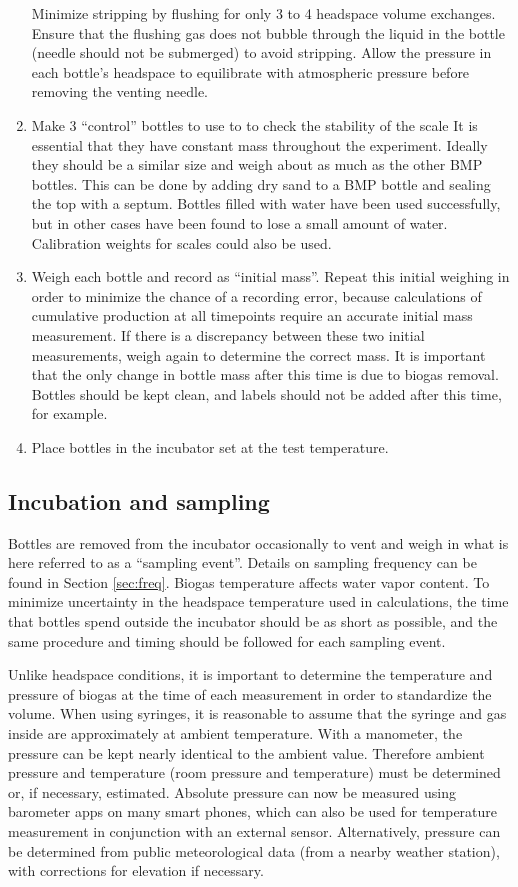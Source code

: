 \documentclass[]{article}
\begin{document}
\begin{enumerate}
{} 
      Minimize  stripping by flushing for only 3 to 4 headspace volume exchanges. 
      Ensure that the flushing gas does not bubble through the liquid in the bottle (needle should not be submerged) to avoid  stripping. 
      Allow the pressure in each bottle’s headspace to equilibrate with atmospheric pressure before removing the venting needle.
    \item Make 3 ``control'' bottles to use to to check the stability of the scale
      It is essential that they have constant mass throughout the experiment. 
      Ideally they should be a similar size and weigh about as much as the other BMP bottles.
      This can be done by adding dry sand to a BMP bottle and sealing the top with a septum. 
      Bottles filled with water have been used successfully, but in other cases have been found to lose a small amount of water.  
      Calibration weights for scales could also be used.
    \item Weigh each bottle and record as ``initial mass''. 
      Repeat this initial weighing in order to minimize the chance of a recording error, because calculations of cumulative  production at all timepoints require an accurate initial mass measurement.
      If there is a discrepancy between these two initial measurements, weigh again to determine the correct mass.
      It is important that the only change in bottle mass after this time is due to biogas removal.
      Bottles should be kept clean, and labels should not be added after this time, for example.
    \item Place bottles in the incubator set at the test temperature.
\end{enumerate}

\subsection{Incubation and sampling}
\label{sec:incsam}
Bottles are removed from the incubator occasionally to vent and weigh in what is here referred to as a ``sampling event''.
Details on sampling frequency can be found in Section \ref{sec:freq}.
Biogas temperature affects water vapor content. 
To minimize uncertainty in the headspace temperature used in calculations, the time that bottles spend outside the incubator should be as short as possible, and the same procedure and timing should be followed for each sampling event. 

Unlike headspace conditions, it is important to determine the temperature and pressure of biogas at the time of each measurement in order to standardize the volume.
When using syringes, it is reasonable to assume that the syringe and gas inside are approximately at ambient temperature.
With a manometer, the pressure can be kept nearly identical to the ambient value.
Therefore ambient pressure and temperature (room pressure and temperature) must be determined or, if necessary, estimated.
Absolute pressure can now be measured using barometer apps on many smart phones, which can also be used for temperature measurement in conjunction with an external sensor.
Alternatively, pressure can be determined from public meteorological data (from a nearby weather station), with corrections for elevation if necessary.
\end{document}
